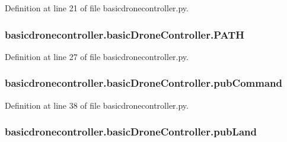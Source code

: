 Definition at line 21 of file basicdronecontroller.\-py.

\hypertarget{classbasicdronecontroller_1_1basicDroneController_adf8d9672e3056c0d4efe910a88d21aa6}{
\subsubsection[{P\-A\-T\-H}]{\setlength{\rightskip}{0pt plus 5cm}basicdronecontroller.\-basic\-Drone\-Controller.\-P\-A\-T\-H}}\label{classbasicdronecontroller_1_1basicDroneController_adf8d9672e3056c0d4efe910a88d21aa6}


Definition at line 27 of file basicdronecontroller.\-py.

\hypertarget{classbasicdronecontroller_1_1basicDroneController_ad6b79da799e584a1d6f06e472f06fab2}{
\subsubsection[{pub\-Command}]{\setlength{\rightskip}{0pt plus 5cm}basicdronecontroller.\-basic\-Drone\-Controller.\-pub\-Command}}\label{classbasicdronecontroller_1_1basicDroneController_ad6b79da799e584a1d6f06e472f06fab2}


Definition at line 38 of file basicdronecontroller.\-py.

\hypertarget{classbasicdronecontroller_1_1basicDroneController_aa26852e9bc4b9a8a78639a7973a0037f}{
\subsubsection[{pub\-Land}]{\setlength{\rightskip}{0pt plus 5cm}basicdronecontroller.\-basic\-Drone\-Controller.\-pub\-Land}}\label{classbasicdronecontroller_1_1basicDroneController_aa26852e9bc4b9a8a78639a7973a0037f}


